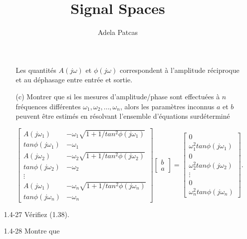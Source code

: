 \documentclass[10pt,twoside,a4paper]{book}
\author{Adela Patcas}
\title{Signal Spaces}
\begin{document}
\setcounter{page}{63}

\begin{enumerate}
  \item[]
  \begin{enumerate}
    \item[] 
    \noindent
    Les quantités $A(j\omega)$ et $\phi (j\omega)$ correspondent à l'amplitude réciproque et au déphasage entre entrée et sortie.
    
    \item[(c)] Montrer que si les mesures d'amplitude/phase sont effectuées à $n$ fréquences différentes $\omega_1, \omega_2, \ldots, \omega_n$, alors les paramètres inconnus $a$ et $b$ peuvent être estimés en résolvant l'ensemble d'équations surdéterminé
    
    \begin{equation*}
      \begin{bmatrix}
        A(j\omega_1) & -\omega_1 \sqrt{1+1/tan^2 \phi (j\omega_1)} \\ 
        tan \phi (j\omega_1) & -\omega_1 \\
        A(j\omega_2) & -\omega_2 \sqrt{1+1/tan^2 \phi (j\omega_2)} \\
        tan \phi (j\omega_2) & -\omega_2 \\
        \vdots \\
        A(j\omega_1)  & -\omega_n \sqrt{1+1/tan^2 \phi (j\omega_n)} \\
        tan \phi (j\omega_n) & -\omega_n
      \end{bmatrix}
      \begin{bmatrix}
        b \\
        a
      \end{bmatrix}
      =
      \begin{bmatrix}
        0 \\
        \omega_1^2 tan \phi (j\omega_1) \\
        0 \\
        \omega_2^2 tan \phi (j\omega_2) \\
        \vdots \\
        0 \\
        \omega_n^2 tan \phi (j\omega_n)
      \end{bmatrix}.
    \end{equation*}
  \end{enumerate}

  \item[1.4-27] Vérifiez (1.38).
  \item[1.4-28] Montre que
  

\end{enumerate}
\end{document}

